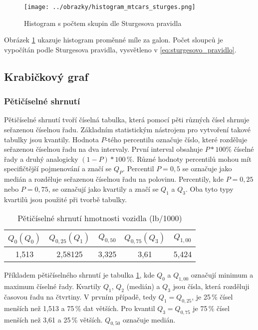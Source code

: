 \begin{figure}[H]
    \centering
    \texttt{[image: ../obrazky/histogram\_mtcars\_sturges.png]}
    \caption{Histogram s počtem skupin dle Sturgesova pravidla} 
    \label{fig:histogram_mtcars_sturges}
\end{figure}

Obrázek \ref{fig:histogram_mtcars_sturges} ukazuje histogram proměnné míle za galon. Počet sloupců je vypočítán podle Sturgesova pravidla,
vysvětleno v \ref{eq:sturgesovo_pravidlo}. 

\subsection{Krabičkový graf}
\subsubsection{Pětičíselné shrnutí}
Pětičíselné shrnutí tvoří číselná tabulka, která pomocí pěti různých čísel shrnuje seřazenou číselnou řadu. Základním statistickým nástrojem pro
vytvoření takové tabulky jsou kvantily. Hodnota $P$-tého percentilu označuje číslo, které rozděluje seřazenou číselnou řadu na dva intervaly. 
První interval obsahuje $P*100 \%$ číselné řady a druhý analogicky $(1-P)*100\,\% $. Různé hodnoty percentilů mohou mít specifičtější pojmenování a značí se $Q_P$.
Percentil $P = 0,5$ se označuje jako medián a rozděluje seřazenou číselnou řadu na polovinu. Percentily, kde $P = 0,25$ nebo $P = 0,75$, se označují
jako kvartily a značí se $Q_{1}$ a $Q_{3}$. Oba tyto typy kvartilů jsou použité při tvorbě tabulky.

\begin{table}[H]
    \centering
    \begin{tabular}[t]{c|c|c|c|c}
        \hline
        $Q_{0} (Q_0)$ & $Q_{0,25} (Q_1) $ & $Q_{0,50}$ & $Q_{0,75} (Q_3)$ & $Q_{1,00}$\\
        \hline
        1,513 & 2,58125 & 3,325 & 3,61 & 5,424\\
        \hline
    \end{tabular}
    \caption{\label{tab:five-number_summary}Pětičíselné shrnutí hmotnosti vozidla (lb/1000)}
\end{table}


Příkladem pětičíselného shrnutí je tabulka \ref{tab:five-number_summary}, kde $Q_{0}$ a $Q_{1,00}$ označují minimum a maximum číselné řady. Kvartily $Q_{1}$, $Q_{2}$ (medián)
a $Q_{3}$ jsou čísla, která rozděluji časovou řadu na čtvrtiny. V prvním případě, tedy $Q_1 = Q_{0,25}$, je 25\,\%  čísel menších než 1,513 a 75\,\%  dat větších. Pro kvantil
$Q_3 = Q_{0,75}$ je 75\,\%  čísel menších než 3,61 a 25\,\%  větších. $Q_{0,50}$ označuje medián.


